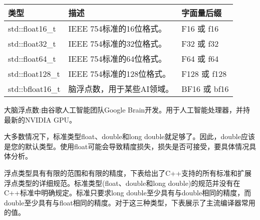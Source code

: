 \begin{longtable}{|l|l|l|}
\hline
\textbf{类型}    & \textbf{描述}                               & \textbf{字面量后缀} \\ \hline
\endfirsthead
%
\endhead
%
std::float16\_t  & IEEE 754标准的16位格式。         & F16 或 f16              \\ \hline
std::float32\_t  & IEEE 754标准的32位格式。          & F32 或 f32              \\ \hline
std::float64\_t  & IEEE 754标准的64位格式。          & F64 或 f64              \\ \hline
std::float128\_t & IEEE 754标准的128位格式。         & F128 或 f128            \\ \hline
std::bfloat16\_t & 脑浮点数，用于某些AI领域。 & BF16 或 bf16            \\ \hline
\end{longtable}

大脑浮点数:由谷歌人工智能团队Google Brain开发。用于人工智能处理器，并持最新的NVIDIA GPU。

大多数情况下，标准类型float、double和long double就足够了。因此，double应该是您的默认类型。使用float可能会导致精度损失，损失是否可接受，要具体情况具体分析。


浮点类型具有有限的范围和有限的精度，下表给出了C++支持的所有标准和扩展浮点类型的详细规范。标准类型(float、double和long double)的规范并没有在C++标准中明确规定。标准只要求long double至少具有与double相同的精度，而double至少具有与float相同的精度。对于这三种类型，下表展示了主流编译器常用的值。

